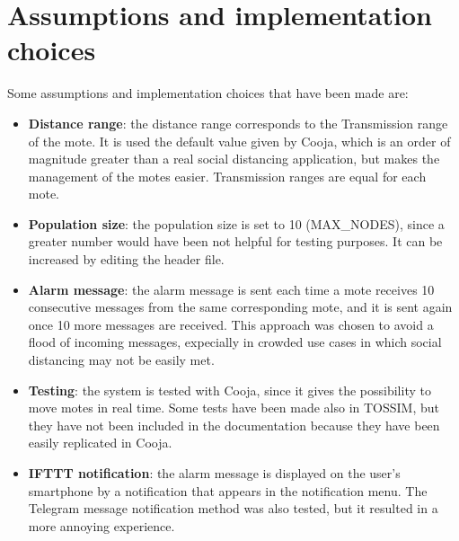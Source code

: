 \documentclass[11pt]{article}
\begin{document}
\section{Assumptions and implementation choices}
Some assumptions and implementation choices that have been made are:
\begin{itemize}
    \item \textbf{Distance range}: the distance range corresponds to the Transmission range of the mote. It is used the default value given by Cooja, which is an order of magnitude greater than a real social distancing application, but makes the management of the motes easier. Transmission ranges are equal for each mote.
    \item \textbf{Population size}: the population size is set to 10 (MAX\_NODES), since a greater number would have been not helpful for testing purposes. It can be increased by editing the header file.
    \item \textbf{Alarm message}: the alarm message is sent each time a mote receives 10 consecutive messages from the same corresponding mote, and it is sent again once 10 more messages are received. This approach was chosen to avoid a flood of incoming messages, expecially in crowded use cases in which social distancing may not be easily met.
    \item \textbf{Testing}: the system is tested with Cooja, since it gives the possibility to move motes in real time. Some tests have been made also in TOSSIM, but they have not been included in the documentation because they have been easily replicated in Cooja.
    \item \textbf{IFTTT notification}: the alarm message is displayed on the user's smartphone by a notification that appears in the notification menu. The Telegram message notification method was also tested, but it resulted in a more annoying experience.
\end{itemize}
\end{document}
